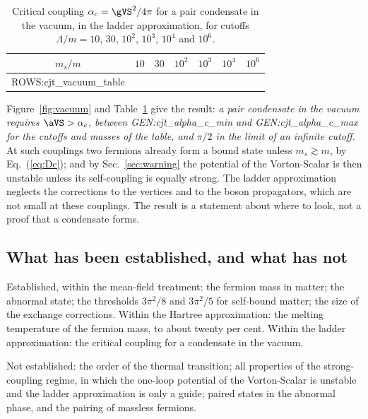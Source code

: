\begin{table}
\caption{\label{tab:vacuum}Critical coupling $\alpha_c=\gVS^2/4\pi$ for a pair condensate in the
vacuum, in the ladder approximation, for cutoffs $\Lambda/m=10$, $30$, $10^2$, $10^3$, $10^4$ and
$10^6$.}
\begin{ruledtabular}
\begin{tabular}{ccccccc}
$m_s/m$ & $10$ & $30$ & $10^2$ & $10^3$ & $10^4$ & $10^6$ \\
\hline
{{ROWS:cjt_vacuum_table}}
\end{tabular}
\end{ruledtabular}
\end{table}

Figure~\ref{fig:vacuum} and Table~\ref{tab:vacuum} give the result: \emph{a pair condensate in the
vacuum requires $\aVS>\alpha_c$, between {{GEN:cjt_alpha_c_min}} and {{GEN:cjt_alpha_c_max}} for the
cutoffs and masses of the table, and $\pi/2$ in the limit of an infinite cutoff.}
At such couplings two fermions already form a bound state unless $m_s\gtrsim m$, by
Eq.~(\ref{eq:Dc}); and by Sec.~\ref{sec:warning} the potential of the Vorton-Scalar is then unstable
unless its self-coupling is equally strong. The ladder approximation neglects the corrections to the
vertices and to the boson propagators, which are not small at these couplings. The result is a
statement about where to look, not a proof that a condensate forms.

\subsection{What has been established, and what has not}

Established, within the mean-field treatment: the fermion mass in matter; the abnormal state; the
thresholds $3\pi^2/8$ and $3\pi^2/5$ for self-bound matter; the size of the exchange corrections.
Within the Hartree approximation: the melting temperature of the fermion mass, to about twenty per
cent. Within the ladder approximation: the critical coupling for a condensate in the vacuum.

Not established: the order of the thermal transition; all properties of the strong-coupling regime,
in which the one-loop potential of the Vorton-Scalar is unstable and the ladder approximation is only
a guide; paired states in the abnormal phase, and the pairing of massless fermions.
